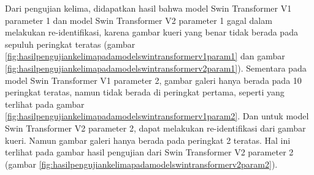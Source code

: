 Dari pengujian kelima, didapatkan hasil bahwa model Swin Transformer V1 parameter 1 dan model Swin Transformer V2 parameter 1 
gagal dalam melakukan re-identifikasi, karena gambar kueri yang benar tidak berada pada sepuluh peringkat teratas (gambar 
\ref{fig:hasilpengujiankelimapadamodelswintransformerv1param1} dan gambar 
\ref{fig:hasilpengujiankelimapadamodelswintransformerv2param1}). Sementara pada model Swin Transformer V1 parameter 2, gambar 
galeri hanya berada pada 10 peringkat teratas, namun tidak berada di peringkat pertama, seperti yang terlihat pada gambar 
\ref{fig:hasilpengujiankelimapadamodelswintransformerv1param2}. Dan untuk model Swin Transformer V2 parameter 2, dapat melakukan 
re-identifikasi dari gambar kueri. Namun gambar galeri hanya berada pada peringkat 2 teratas. Hal ini terlihat pada gambar 
hasil pengujian dari Swin Transformer V2 parameter 2 (gambar \ref{fig:hasilpengujiankelimapadamodelswintransformerv2param2}).






